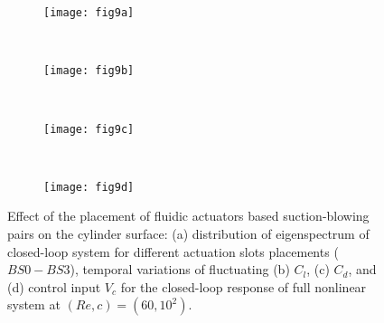 \documentclass[standard]{jfm}
\begin{document}
\begin{figure}
\centering
\begin{minipage}{.4\textwidth}
  \begin{subfigure}[c]{0.47\textwidth}
\centering
  \texttt{[image: fig9a]} 
    \caption{}
    \label{fig:dfbs_eig}
    \end{subfigure}  \\
\end{minipage} 
\begin{minipage}{.4\textwidth}
\begin{subfigure}[b]{0.4\textwidth} 
\centering
  \texttt{[image: fig9b]}
	\caption{}
	\label{fig:dfbs_lco_cl}
	\end{subfigure}	\\
\begin{subfigure}[b]{0.4\textwidth} 
\centering
  \texttt{[image: fig9c]} 
	\caption{}
	\label{fig:dfbs_lco_cd}
	\end{subfigure}	\\
\begin{subfigure}[b]{0.4\textwidth} 
\centering
  \texttt{[image: fig9d]}
	\caption{}
	\label{fig:dfbs_lco_uc}
	\end{subfigure}				
\end{minipage}%
\caption{Effect of the placement of fluidic actuators based suction-blowing pairs 
on the cylinder surface: (a) distribution of eigenspectrum of closed-loop system for different actuation slots placements ($BS0-BS3$),
		temporal variations of fluctuating (b) $C_l$, (c) $C_d$, 
                and (d) control input $V_c$ 
		for the closed-loop response of full nonlinear 
                system at $(Re,c)=(60,10^2)$. 
                }
\end{figure}
 
\end{document}
